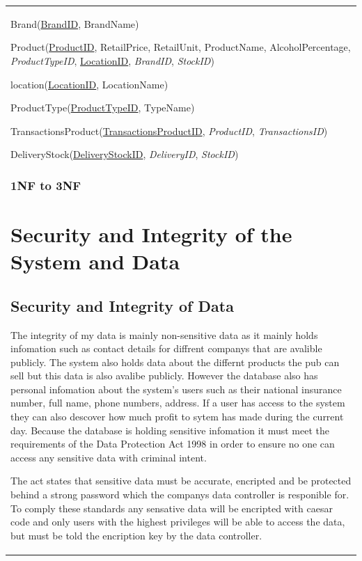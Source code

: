 \begin{center}
\begin{tabular}{|p{3cm}|}
Brand(\underline{BrandID}, BrandName)

Product(\underline{ProductID}, RetailPrice, RetailUnit, ProductName, AlcoholPercentage, \emph{ProductTypeID}, \underline{LocationID}, \emph{BrandID}, \emph{StockID})

location(\underline{LocationID}, LocationName)

ProductType(\underline{ProductTypeID}, TypeName)

TransactionsProduct(\underline{TransactionsProductID}, \emph{ProductID}, \emph{TransactionsID})

DeliveryStock(\underline{DeliveryStockID}, \emph{DeliveryID}, \emph{StockID})

\subsubsection{1NF to 3NF}

\section{Security and Integrity of the System and Data}

\subsection{Security and Integrity of Data}

The integrity of my data is mainly non-sensitive data as it mainly holds infomation such as contact details for diffrent companys that are avalible publicly. The system also holds data about the differnt products the pub can sell but this data is also avalibe publicly. However the database also has personal infomation about the system's users such as their national insurance number, full name, phone numbers, address. If a user has access to the system they can also descover how much profit to sytem has made during the current day. Because the database is holding sensitive infomation it must meet the requirements of the Data Protection Act 1998 in order to ensure no one can access any sensitive data with criminal intent. 

The act states that sensitive data must be accurate, encripted and be protected behind a strong password which the companys data controller is responible for. To comply these standards any sensative data will be encripted with caesar code  and only users with the highest privileges will be able to access the data, but must be told the encription key by the data controller.


\end{tabular}
\end{center}
